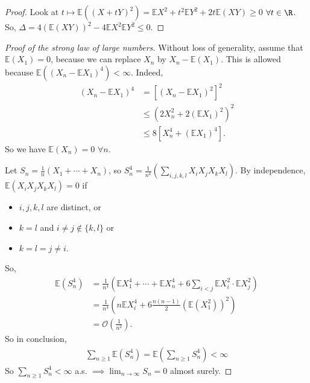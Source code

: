 \documentclass{article}
\newcommand{\1}[1]{\mathbbm{1}_{#1}}
\newcommand{\E}{\mathbb{E}}
\begin{document}
\begin{proof}
    Look at $t \mapsto \mathbb{E}((X + t Y)^2) = \mathbb{E}X^2 + t^2 \mathbb{E} Y^2 + 2 t \mathbb{E}(XY) \geq 0$ $\forall t \in \R$.
    So, $\Delta = 4 (\mathbb{E}(XY))^2 - 4 \mathbb{E}X^2 \mathbb{E}Y^2 \leq 0$.
\end{proof}

\begin{proof}[Proof of the strong law of large numbers]
    Without loss of generality, assume that $\mathbb{E}(X_1) = 0$, because we can replace $X_n$ by $X_n - \mathbb{E}(X_1)$.
    This is allowed because $\mathbb{E}((X_n - \mathbb{E}X_1)^4) < \infty$.
    Indeed,
    \begin{align*}
        (X_n - \mathbb{E}X_1)^4 &= [(X_n - \mathbb{E}X_1)^2]^2 \\
                                &\leq (2X_n^2 + 2(\mathbb{E}X_1)^2)^2 \\
                                &\leq 8 [X_n^4 + (\mathbb{E}X_1)^4].
    \end{align*}
    So we have $\mathbb{E}(X_n) = 0$ $\forall n$.

    Let $S_n = \frac{1}{n} (X_1 + \dotsb + X_n)$, so $S_n^4  = \frac{1}{n^4} (\sum_{i,j,k,l} X_i X_j X_k X_l)$.
    By independence, $\mathbb{E}(X_i X_j X_k X_l) = 0$ if
    \begin{itemize}[label=--]
        \item $i, j, k, l$ are distinct, or
        \item $k = l$ and $i \neq j \notin \{k, l\}$ or
        \item $k = l = j \neq i$.
    \end{itemize}
    So,
    \begin{align*}
        \mathbb{E}(S_n^4) &= \frac{1}{n^4} \left(\mathbb{E}X_1^4 + \dotsb + \mathbb{E}X_n^4 + 6 \sum_{i < j} \mathbb{E}X_i^2 \cdot \mathbb{E}X_j^2\right) \\
                          &= \frac{1}{n^4} \left(n \mathbb{E}X_i^4 + 6 \frac{n(n-1)}{2} \left(\mathbb{E}(X_1^2)\right)^2\right) \\
                          &= \mathcal{O}\left(\frac{1}{n^2}\right).
    \end{align*}
    So in conclusion,
    \begin{equation*}
        \begin{aligned}
            \sum_{n \geq 1} \E(S_n^4) = \E\left(\sum_{n \geq 1} S_n^4\right) < \infty
        \end{aligned}
    \end{equation*}
    So $\sum_{n \geq 1} S_n^4 < \infty$ a.s. $\implies \lim_{n\to \infty} S_n = 0$ almost surely.
\end{proof}
\end{document}
